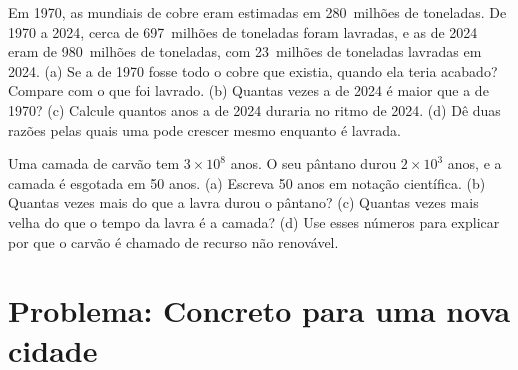 \begin{exercise}[$\star\star\star$]\label{exo:g9:earth-resources:11}
Em 1970, as  mundiais de cobre eram estimadas em 280~milhões de
toneladas. De 1970 a 2024, cerca de 697~milhões de toneladas foram
lavradas, e as  de 2024 eram de 980~milhões de toneladas, com
23~milhões de toneladas lavradas em 2024. (a) Se a  de 1970 fosse
todo o cobre que existia, quando ela teria acabado? Compare com o que foi
lavrado. (b) Quantas vezes a  de 2024 é maior que a de 1970? (c)
Calcule quantos anos a  de 2024 duraria no ritmo de 2024. (d) Dê
duas razões pelas quais uma  pode crescer mesmo enquanto é
lavrada.
\end{exercise}

\begin{exercise}[$\star\star\star$]\label{exo:g9:earth-resources:12}
Uma camada de carvão tem $3 \times 10^8$ anos. O seu pântano durou
$2 \times 10^3$ anos, e a camada é esgotada em 50 anos. (a) Escreva 50
anos em notação científica. (b) Quantas vezes mais do que a lavra durou
o pântano? (c) Quantas vezes mais velha do que o tempo da lavra é a
camada? (d) Use esses números para explicar por que o carvão é chamado
de recurso não renovável.
\end{exercise}

\section{Problema: Concreto para uma nova cidade}

